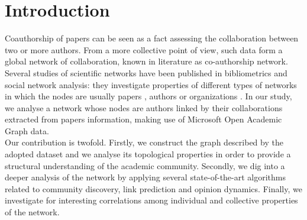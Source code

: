 \documentclass[sigchi]{acmart}
\begin{document}
\section{Introduction}
Coauthorship of papers can be seen as a fact assessing the collaboration between two or more authors. From a more collective point of view, such data form a global network of collaboration, known in literature as co-authorship network.
Several studies of scientific networks have been published in bibliometrics and social network analysis: they investigate properties of different types of networks in which the nodes are usually papers \cite{papers}, authors \cite{Newman5200} or organizations \cite{organizations}. In our study, we analyse a network whose nodes are authors linked by their collaborations extracted from papers information, making use of Microsoft Open Academic Graph data. \\
Our contribution is twofold. Firstly, we construct the graph described by the adopted dataset and we analyse its topological properties in order to provide a structural understanding of the academic community. Secondly, we dig into a deeper analysis of the network by applying several state-of-the-art algorithms related to community discovery, link prediction and opinion dynamics. Finally, we investigate for interesting correlations among individual and collective properties of the network. \\
\end{document}
